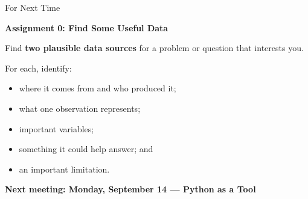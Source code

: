 \documentclass[aspectratio=169]{beamer}
\newcommand{\redrule}{\par\vspace{0.15cm}{\color{LangRed}\rule{\linewidth}{1.5pt}}}
\begin{document}
\begin{frame}{For Next Time}
\redrule
{\LARGE\bfseries Assignment 0: Find Some Useful Data}
\vspace{0.35cm}

Find \textbf{two plausible data sources} for a problem or question that interests you.

\vspace{0.25cm}
For each, identify:
\begin{itemize}
  \item where it comes from and who produced it;
  \item what one observation represents;
  \item important variables;
  \item something it could help answer; and
  \item an important limitation.
\end{itemize}

\vfill
{\bfseries Next meeting: Monday, September 14 --- Python as a Tool}
\end{frame}
\end{document}

